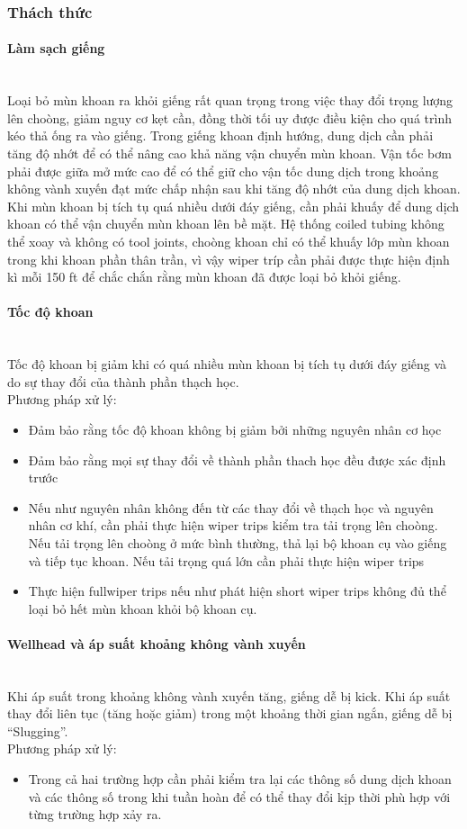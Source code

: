 \documentclass[12pt,a4paper]{article}
\newcommand{\subsubsubsection}[1]{\paragraph{#1}\mbox{}\\}
\begin{document}
\subsubsection{Thách thức}
	\subsubsubsection{Làm sạch giếng}
	Loại bỏ mùn khoan ra khỏi giếng rất quan trọng trong việc thay đổi trọng lượng lên choòng, giảm nguy cơ kẹt cần, đồng thời tối uy được điều kiện cho quá trình kéo thả ống ra vào giếng. Trong giếng khoan định hướng, dung dịch cần phải tăng độ nhớt để có thể nâng cao khả năng vận chuyển mùn khoan. Vận tốc bơm phải được giữa mở mức cao để có thể giữ cho vận tốc dung dịch trong khoảng không vành xuyến đạt mức chấp nhận sau khi tăng độ nhớt của dung dịch khoan. Khi mùn khoan bị tích tụ quá nhiều dưới đáy giếng, cần phải khuấy để dung dịch khoan có thể vận chuyển mùn khoan lên bề mặt. Hệ thống coiled tubing không thể xoay và không có tool joints, choòng khoan chỉ có thể khuấy lớp mùn khoan trong khi khoan phần thân trần, vì vậy wiper tríp cần phải được thực hiện định kì mỗi 150 ft để chắc chắn rằng mùn khoan đã được loại bỏ khỏi giếng.
	\subsubsubsection{Tốc độ khoan}
	Tốc độ khoan bị giảm khi có quá nhiều mùn khoan bị tích tụ dưới đáy giếng và do sự thay đổi của thành phần thạch học. \\
	Phương pháp xử lý:
	\begin{itemize}
		\item Đảm bảo rằng tốc độ khoan không bị giảm bởi những nguyên nhân cơ học 
		\item Đảm bảo rằng mọi sự thay đổi về thành phần thach học đều được xác định trước
		\item Nếu như nguyên nhân không đến từ các thay đổi về thạch học và nguyên nhân cơ khí, cần phải thực hiện wiper trips kiểm tra tải trọng lên choòng. Nếu tải trọng lên choòng ở mức bình thường, thả lại bộ khoan cụ vào giếng và tiếp tục khoan. Nếu tải trọng quá lớn cần phải thực hiện wiper trips 
		\item Thực hiện fullwiper trips nếu như phát hiện short wiper trips không đủ thể loại bỏ hết mùn khoan khỏi bộ khoan cụ.
	\end{itemize}
	\subsubsubsection{Wellhead và áp suất khoảng không vành xuyến}
	Khi áp suất trong khoảng không vành xuyến tăng, giếng dễ bị kick. Khi áp suất thay đổi liên tục (tăng hoặc giảm) trong một khoảng thời gian ngắn, giếng dễ bị ``Slugging''.\\
	Phương pháp xử lý:
	\begin{itemize}
		\item Trong cả hai trường hợp cần phải kiểm tra lại các thông số dung dịch khoan và các thông số trong khi tuần hoàn để có thể thay đổi kịp thời phù hợp với từng trường hợp xảy ra.
	\end{itemize}
\end{document}
